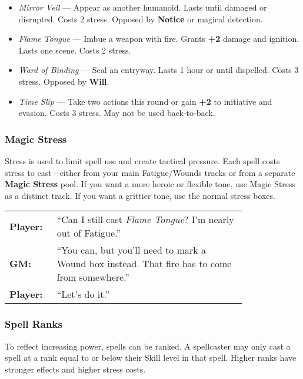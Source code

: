 \begin{WyrdExample}
    \begin{itemize}
        \item \textit{Mirror Veil} — Appear as another humanoid. Lasts until damaged or disrupted. Costs 2 stress. Opposed by \textbf{Notice} or magical detection.
        \item \textit{Flame Tongue} — Imbue a weapon with fire. Grants \textbf{+2} damage and ignition. Lasts one scene. Costs 2 stress.
        \item \textit{Ward of Binding} — Seal an entryway. Lasts 1 hour or until dispelled. Costs 3 stress. Opposed by \textbf{Will}.
        \item \textit{Time Slip} — Take two actions this round or gain \textbf{+2} to initiative and evasion. Costs 3 stress. May not be used back-to-back.
    \end{itemize}
\end{WyrdExample}

\subsubsection{Magic Stress}

Stress is used to limit spell use and create tactical pressure. Each spell costs stress to cast—either from your main Fatigue/Wounds tracks or from a separate \textbf{Magic Stress} pool. If you want a more heroic or flexible tone, use Magic Stress as a distinct track. If you want a grittier tone, use the normal stress boxes.

\begin{WyrdExample}
    \begin{tabular}{@{}l p{0.8\linewidth}@{}}
        \textbf{Player:} & “Can I still cast \textit{Flame Tongue}? I’m nearly out of Fatigue.” \\
        \textbf{GM:} & “You can, but you’ll need to mark a Wound box instead. That fire has to come from somewhere.” \\
        \textbf{Player:} & “Let’s do it.”  
    \end{tabular}
\end{WyrdExample}

\subsubsection{Spell Ranks}

To reflect increasing power, spells can be ranked. A spellcaster may only cast a spell at a rank equal to or below their Skill level in that spell. Higher ranks have stronger effects and higher stress costs.

